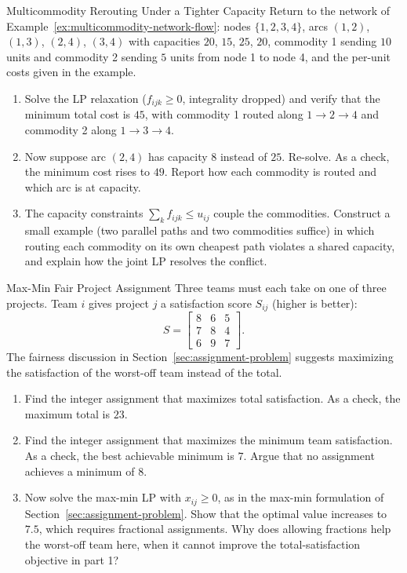 
\begin{ex}{Multicommodity Rerouting Under a Tighter Capacity}{}
\label{ex:multicommodity-rerouting}
 Return to the network of Example~\ref{ex:multicommodity-network-flow}: nodes $\{1,2,3,4\}$, arcs $(1,2)$, $(1,3)$, $(2,4)$, $(3,4)$ with capacities $20$, $15$, $25$, $20$, commodity 1 sending $10$ units and commodity 2 sending $5$ units from node 1 to node 4, and the per-unit costs given in the example.
\begin{enumerate}
\item Solve the LP relaxation ($f_{ijk} \geq 0$, integrality dropped) and verify that the minimum total cost is $45$, with commodity 1 routed along $1 \to 2 \to 4$ and commodity 2 along $1 \to 3 \to 4$.
\item Now suppose arc $(2,4)$ has capacity $8$ instead of $25$.  Re-solve.  As a check, the minimum cost rises to $49$.  Report how each commodity is routed and which arc is at capacity.
\item The capacity constraints $\sum_k f_{ijk} \leq u_{ij}$ couple the commodities.  Construct a small example (two parallel paths and two commodities suffice) in which routing each commodity on its own cheapest path violates a shared capacity, and explain how the joint LP resolves the conflict.
\end{enumerate}
\end{ex}

\begin{ex}{Max-Min Fair Project Assignment}{}
\label{ex:maxmin-fair-assignment}
 Three teams must each take on one of three projects.  Team $i$ gives project $j$ a satisfaction score $S_{ij}$ (higher is better):
\[
S = \begin{bmatrix} 8 & 6 & 5 \\ 7 & 8 & 4 \\ 6 & 9 & 7 \end{bmatrix}.
\]
The fairness discussion in Section~\ref{sec:assignment-problem} suggests maximizing the satisfaction of the worst-off team instead of the total.
\begin{enumerate}
\item Find the integer assignment that maximizes total satisfaction.  As a check, the maximum total is $23$.
\item Find the integer assignment that maximizes the minimum team satisfaction.  As a check, the best achievable minimum is $7$.  Argue that no assignment achieves a minimum of $8$.
\item Now solve the max-min LP with $x_{ij} \geq 0$, as in the max-min formulation of Section~\ref{sec:assignment-problem}.  Show that the optimal value increases to $7.5$, which requires fractional assignments.  Why does allowing fractions help the worst-off team here, when it cannot improve the total-satisfaction objective in part 1?
\end{enumerate}
\exrefs{\S\ref{sec:assignment-problem}}
\end{ex}

